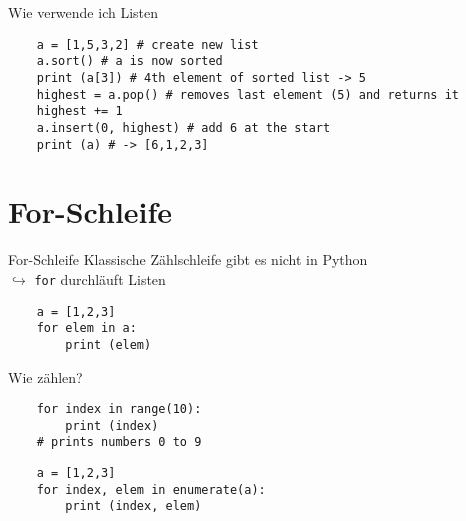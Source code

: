 \begin{frame}[fragile]{Wie verwende ich Listen}
    \begin{lstlisting}
    a = [1,5,3,2] # create new list
    a.sort() # a is now sorted
    print (a[3]) # 4th element of sorted list -> 5
    highest = a.pop() # removes last element (5) and returns it
    highest += 1
    a.insert(0, highest) # add 6 at the start
    print (a) # -> [6,1,2,3]
    \end{lstlisting}
\end{frame}

\section{For-Schleife}

\begin{frame}[fragile]{For-Schleife}
    Klassische Zählschleife gibt es nicht in Python\\
    $\hookrightarrow$ \texttt{for} durchläuft Listen
    \begin{lstlisting}
    a = [1,2,3]
    for elem in a:
        print (elem)
    \end{lstlisting}
\end{frame}

\begin{frame}[fragile]{Wie zählen?}
    \begin{lstlisting}
    for index in range(10):
        print (index)
    # prints numbers 0 to 9
    \end{lstlisting}
    \begin{lstlisting}
    a = [1,2,3]
    for index, elem in enumerate(a):
        print (index, elem)
    \end{lstlisting}
\end{frame}


